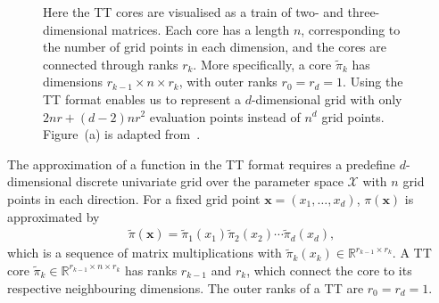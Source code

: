 \begin{figure}[ht!]
	\centering
	\begin{subfigure}{\textwidth}
		
		\caption{}
	\end{subfigure}
	\centering
	\begin{subfigure}{\textwidth}
		\caption{}
	\end{subfigure}
	\caption[Visualisation of a tensor train]{Here the TT cores are visualised as a train of two- and three-dimensional matrices. 
		Each core has a length $n$, corresponding to the number of grid points in each dimension, and the cores are connected through ranks $r_k$. 
		More specifically, a core $\tilde{\pi}_k$ has dimensions $r_{k-1} \times n \times r_k$, with outer ranks $r_0 = r_d = 1$.
		Using the TT format enables us to represent a $d$-dimensional grid with only $2nr + (d-2)nr^2$ evaluation points instead of $n^d$ grid points.
		Figure~(a) is adapted from~\cite{fox2021grid}.}
	\label{fig:TTfig}
\end{figure}
The approximation of a function in the TT format requires a predefine $d$-dimensional discrete univariate grid over the parameter space $\mathcal{X}$ with $n$ grid points in each direction.
For a fixed grid point $\bm{x} = (x_1, \dots, x_d)$,  $\pi(\bm{x})$ is approximated by
\begin{align*}
	\tilde{\pi}(\bm{x}) = 	\tilde{\pi}_1(x_1)  \tilde{\pi}_2(x_2)  \cdots \tilde{\pi}_d(x_d),
\end{align*}
which is a sequence of matrix multiplications with $\tilde{\pi}_k(x_k) \in \mathbb{R}^{r_{k-1} \times r_k}$.
A TT core  $\tilde{\pi}_k \in \mathbb{R}^{r_{k-1} \times n \times r_k}$ has ranks $ r_{k-1}$ and $r_k$, which connect the core to its respective neighbouring dimensions.
The outer ranks of a TT are $r_0 = r_d = 1$.
